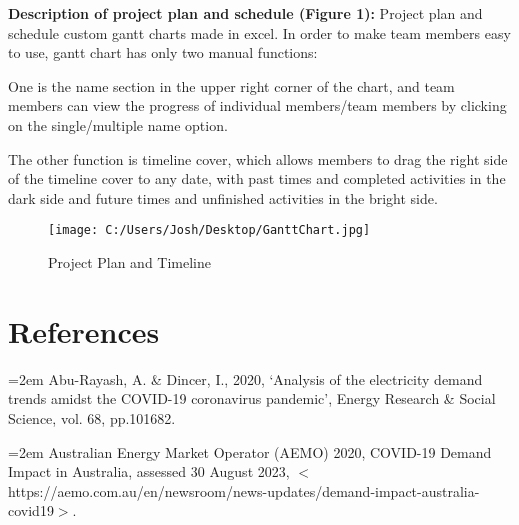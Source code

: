 \documentclass[mstat,12pt]{unswthesis}
\begin{document}
\textbf{Description of project plan and schedule (Figure 1):}
Project plan and schedule custom gantt charts made in excel. In order to make team members easy to use, gantt chart has only two manual functions: \item One is the name section in the upper right corner of the chart, and team members can view the progress of individual members/team members by clicking on the single/multiple name option. \item The other function is timeline cover, which allows members to drag the right side of the timeline cover to any date, with past times and completed activities in the dark side and future times and unfinished activities in the bright side.	

\newpage
	\begin{figure}[htbp]%
		\centering
		\vspace{-4cm}
		\texttt{[image: C:/Users/Josh/Desktop/GanttChart.jpg]} %
		\caption{Project Plan and Timeline}
	\end{figure}%
	
\bigskip
\hypertarget{references}{%
\chapter*{References}\label{references}}




\hypertarget{refs}{}

\leavevmode{}%

\hangindent=2em
Abu-Rayash, A. \& Dincer, I., 2020, ‘Analysis of the electricity demand trends amidst the COVID-19 coronavirus pandemic’, Energy Research \& Social Science, vol. 68, pp.101682. \hfill\break

\hangindent=2em
\noindent Australian Energy Market Operator (AEMO) 2020, COVID-19 Demand Impact in Australia, assessed 30 August 2023, $<$https://aemo.com.au/en/newsroom/news-updates/demand-impact-australia-covid19$>$. \hfill\break
\end{document}
